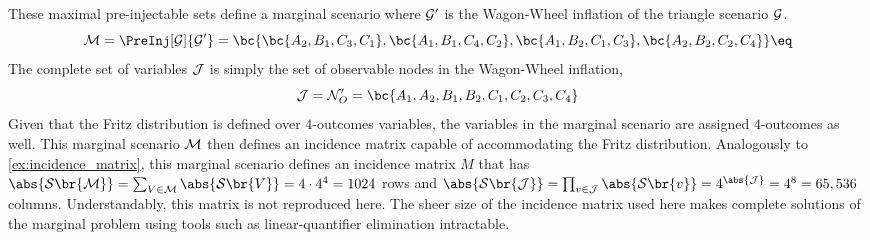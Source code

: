 \documentclass[aps, 10pt, english, twoside, pra, nofootinbib, tightenlines, longbibliography]{revtex4-1}
\renewcommand{\Events}[1]{\mathcal{S}\br{#1}} %
\begin{document}
    These maximal pre-injectable sets define a marginal scenario where $\mathcal{G}'$ is the Wagon-Wheel inflation of the triangle scenario $\mathcal{G}$.
    \[ \mscenario = \PreInj[\graph]{\graph'} = \bc{\bc{A_2, B_1, C_3, C_1}, \bc{A_1, B_1, C_4, C_2}, \bc{A_1, B_2, C_1, C_3}, \bc{A_2, B_2, C_2, C_4}} \eq \label{eq:wagon_wheel_marginal_model}\]
    The complete set of variables $\mathcal{J}$ is simply the set of observable nodes in the Wagon-Wheel inflation,
    \[ \jointvar = \nodes'_O = \bc{A_1, A_2, B_1, B_2, C_1, C_2, C_3, C_4} \]
    Given that the Fritz distribution is defined over $4$-outcomes variables, the variables in the marginal scenario are assigned $4$-outcomes as well. This marginal scenario $\mathcal{M}$ then defines an incidence matrix capable of accommodating the Fritz distribution.
    Analogously to \cref{ex:incidence_matrix}, this marginal scenario defines an incidence matrix $M$ that has $\abs{\Events{\mscenario}} = \sum_{V \in \mscenario} \abs{\Events{V}} = 4 \cdot 4^{4} = 1024$ rows and $\abs{\Events{\jointvar}} = \prod_{v \in \jointvar} \abs{\Events{v}} = 4^{\abs{\jointvar}} = 4^8 = 65,536$ columns. Understandably, this matrix is not reproduced here. The sheer size of the incidence matrix used here makes complete solutions of the marginal problem using tools such as linear-quantifier elimination intractable.
\end{document}
